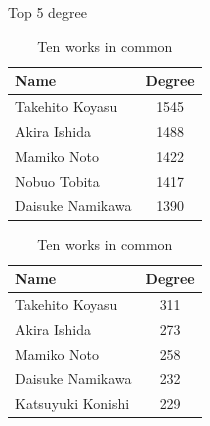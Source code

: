 \begin{frame}{Top 5 degree}
\begin{table}[!htb]
    \begin{minipage}{.5\textwidth}
        \centering
            \begin{tabular}{|l|c|}
				\hline
				Name & Degree \\ 
				\hline
				Takehito Koyasu & 1545 \\ 
				\hline
				Akira Ishida & 1488 \\ 
				\hline
				Mamiko Noto & 1422 \\ 
				\hline
				Nobuo Tobita & 1417 \\ 
				\hline
				Daisuke Namikawa & 1390 \\ 
				\hline
			\end{tabular}
            \caption{One work in common}
    \end{minipage}%
    \begin{minipage}{.6\textwidth}
        \centering
        \begin{tabular}{|l|c|}
				\hline
				Name & Degree \\
				\hline
				Takehito Koyasu & 311 \\
				\hline
				Akira Ishida & 273 \\
				\hline
				Mamiko Noto & 258 \\
				\hline
				Daisuke Namikawa & 232 \\
				\hline
				Katsuyuki Konishi & 229 \\
				\hline
			\end{tabular}
            \caption{Ten works in common}
    \end{minipage}
\end{table}
\end{frame}

